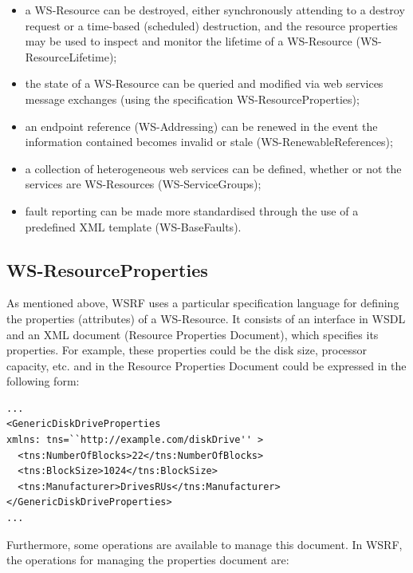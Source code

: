 \begin{itemize}
\item a WS-Resource can be destroyed, either synchronously attending to a
destroy request or a time-based (scheduled)
destruction, and the resource properties may be used to inspect and monitor the lifetime of a WS-Resource (WS-ResourceLifetime);
\item the state of  a WS-Resource 
can be queried and modified via web services
message exchanges (using the specification WS-ResourceProperties);
\item an endpoint reference (WS-Addressing) can be renewed in the
event the information contained becomes invalid
or stale (WS-RenewableReferences);
\item a collection of heterogeneous web services can be defined,
whether or not the services are WS-Resources (WS-ServiceGroups);  
\item fault reporting can be made more standardised through the use of a predefined XML
template (WS-BaseFaults). 
\end{itemize} 

\subsection*{WS-ResourceProperties}

As mentioned above, WSRF uses a particular specification language 
for defining the properties (attributes) of a WS-Resource. It consists of 
an interface in WSDL and an XML document (Resource Properties Document), which
specifies its properties. For example, these properties could be the disk size, processor capacity, etc. and
in the Resource Properties Document could be expressed in the following form:

\begin{lstlisting}
...
<GenericDiskDriveProperties 
xmlns: tns=``http://example.com/diskDrive'' >
  <tns:NumberOfBlocks>22</tns:NumberOfBlocks>
  <tns:BlockSize>1024</tns:BlockSize>
  <tns:Manufacturer>DrivesRUs</tns:Manufacturer>
</GenericDiskDriveProperties>
...
\end{lstlisting}

Furthermore, some operations are available to manage this document. In WSRF, the operations for managing the properties document are:

